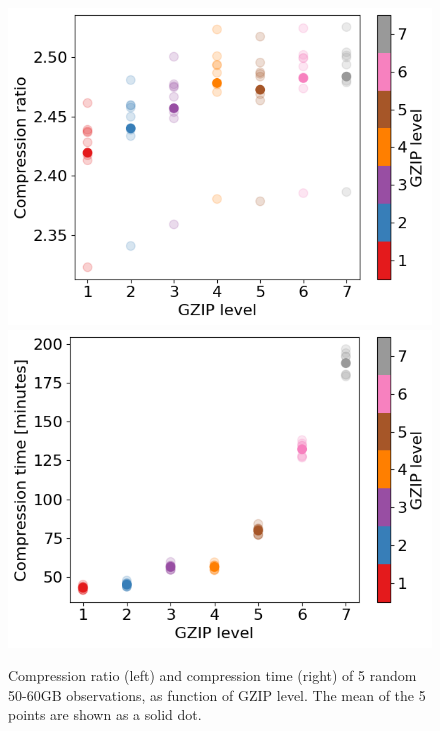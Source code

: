 \documentclass[10pt, a4paper]{article}
\begin{document}
\begin{figure}[H]
    \centering
    \includegraphics[scale=0.55]{plots/gzip_compratio.png}
    \includegraphics[scale=0.55]{plots/gzip_comptime.png}
    \caption{Compression ratio (left) and compression time (right) of 5 random 50-60GB observations, as function of GZIP level. The mean of the 5 points are shown as a solid dot.}
    \label{fig:fig1}
\end{figure}
\end{document}
